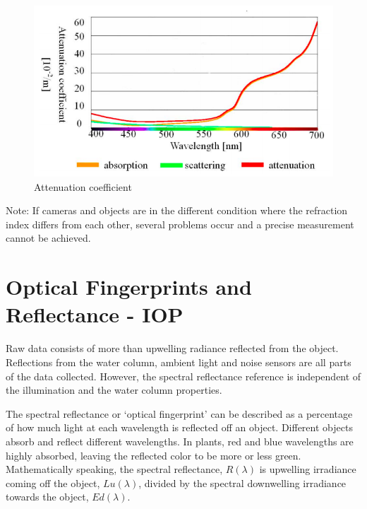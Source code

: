 \begin{figure}[H]
\centering
  \includegraphics[width=12cm]{Images/theory/attcoeff.png}
  \caption{Attenuation coefficient}
  \label{fig:attcoeff}
\end{figure}




Note: If cameras and objects are in the different condition where the refraction index differs from each other, several problems occur and a precise measurement cannot be achieved.

\section{Optical Fingerprints and Reflectance - IOP}
Raw data consists of more than upwelling radiance reflected from the object. Reflections from the water column, ambient light and noise sensors are all parts of the data collected. However, the spectral reflectance reference is independent of the illumination and the water column properties. 

The spectral reflectance or ‘optical fingerprint’ can be described as a percentage of how much light at each wavelength is reflected off an object. Different objects absorb and reflect different wavelengths. In plants, red and blue wavelengths are highly absorbed, leaving the reflected color to be more or less green. Mathematically speaking, the spectral reflectance, $R(\lambda)$ is upwelling irradiance coming off the object, $Lu(\lambda)$, divided by the spectral downwelling irradiance towards the object, $Ed(\lambda)$.

